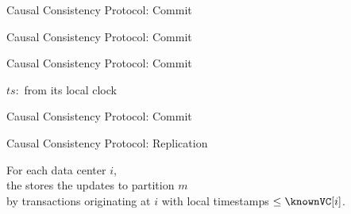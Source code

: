 \begin{frame}{Causal Consistency Protocol: Commit}
  \begin{center}
  \end{center}
\end{frame}

\begin{frame}{Causal Consistency Protocol: Commit}
  \begin{center}


  \end{center}
\end{frame}

\begin{frame}{Causal Consistency Protocol: Commit}
  \begin{center}
    $ts:$  from its local clock

  \end{center}
\end{frame}

\begin{frame}{Causal Consistency Protocol: Commit}
  \begin{center}


  \end{center}
\end{frame}

\begin{frame}{Causal Consistency Protocol: Replication}
  \begin{property}
    \begin{center}
      For each data center $i$, \\[3pt]
      the  stores the updates to partition $m$ \\[3pt]
      by transactions originating at $i$
      with local timestamps $\le \knownVC[i]$.
    \end{center}
  \end{property}

  \vspace{0.30cm}
  \begin{center}

    \vspace{0.20cm}
  \end{center}
\end{frame}

